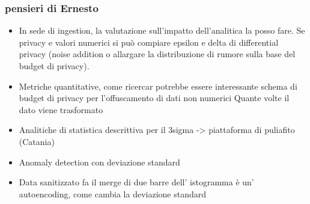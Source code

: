 \subsubsection{pensieri di Ernesto}
\begin{itemize}
    \item In sede di ingestion, la valutazione sull'impatto dell'analitica la posso fare. Se privacy e valori numerici si può compiare epsilon e delta di differential privacy (noise addition o allargare la distribuzione di rumore sulla base del budget di privacy).
    \item Metriche quantitative, come ricercar potrebbe essere interessante schema di budget di privacy per l'offuscamento di dati non numerici Quante volte il dato viene trasformato
    \item Analitiche di statistica descrittiva per il 3sigma -> piattaforma di puliafito (Catania)
    \item Anomaly detection con deviazione standard
    \item Data sanitizzato fa il merge di due barre dell' istogramma è un' autoencoding, come cambia la deviazione standard
\end{itemize}
